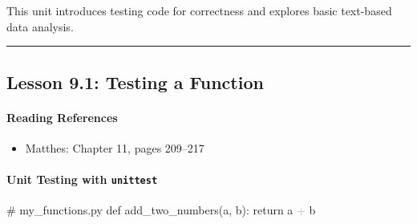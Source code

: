 \documentclass[
  justified,
  openright,
]{tufte-book}
\let\subsubsection\paragraph
\let\paragraph\paragraph
\newcommand{\CommentTok}[1]{\textcolor{MidGray}{#1}}
\newcommand{\ControlFlowTok}[1]{\textcolor{BrandBlue}{#1}}
\newcommand{\KeywordTok}[1]{\textcolor{BrandBlue}{#1}}
\newcommand{\NormalTok}[1]{#1}
\newcommand{\OperatorTok}[1]{\textcolor{DarkGray}{#1}}
\newenvironment{Shaded}{%
  \begin{snugshade}
}{%
  \end{snugshade}
}
\let\subsubsection\paragraph
\let\paragraph\paragraph
\providecommand{\tightlist}{%
  \setlength{\itemsep}{0pt}\setlength{\parskip}{0pt}}
\begin{document}
This unit introduces testing code for correctness and explores basic
text-based data analysis.

\begin{center}\rule{0.5\linewidth}{0.5pt}\end{center}

\subsection{Lesson 9.1: Testing a
Function}\label{lesson-9.1-testing-a-function}

\subsubsection{Reading References}\label{reading-references-27}

\begin{itemize}
\tightlist
\item
  Matthes: Chapter 11, pages 209--217
\end{itemize}

\subsubsection{\texorpdfstring{Unit Testing with
\texttt{unittest}}{Unit Testing with unittest}}\label{unit-testing-with-unittest}

\begin{Shaded}
\begin{Highlighting}[]
\CommentTok{\# my\_functions.py}
\KeywordTok{def}\NormalTok{ add\_two\_numbers(a, b):}
    \ControlFlowTok{return}\NormalTok{ a }\OperatorTok{+}\NormalTok{ b}
\end{Highlighting}
\end{Shaded}
\end{document}

